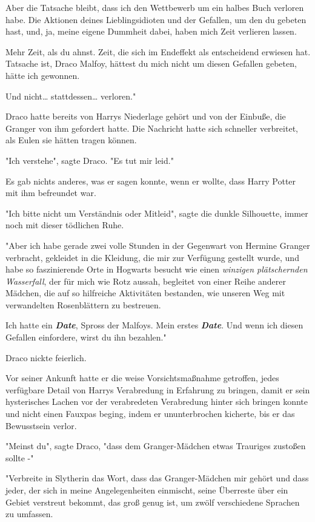 {Aber die Tatsache bleibt, dass ich den Wettbewerb um ein halbes Buch verloren habe. Die Aktionen deines Lieblingsidioten und der Gefallen, um den du gebeten hast, und, ja, meine eigene Dummheit dabei, haben mich Zeit verlieren lassen.

Mehr Zeit, als du ahnst. Zeit, die sich im Endeffekt als entscheidend erwiesen hat. Tatsache ist, Draco Malfoy, hättest du mich nicht um diesen Gefallen gebeten, hätte ich gewonnen.

Und nicht… stattdessen… verloren."

Draco hatte bereits von Harrys Niederlage gehört und von der Einbuße, die Granger von ihm gefordert hatte. Die Nachricht hatte sich schneller verbreitet, als Eulen sie hätten tragen können.

"Ich verstehe", sagte Draco. "Es tut mir leid."

Es gab nichts anderes, was er sagen konnte, wenn er wollte, dass Harry Potter mit ihm befreundet war.

"Ich bitte nicht um Verständnis oder Mitleid", sagte die dunkle Silhouette, immer noch mit dieser tödlichen Ruhe.

"Aber ich habe gerade zwei volle Stunden in der Gegenwart von Hermine Granger verbracht, gekleidet in die Kleidung, die mir zur Verfügung gestellt wurde, und habe so faszinierende Orte in Hogwarts besucht wie einen \emph{winzigen plätschernden Wasserfall}, der für mich wie Rotz aussah, begleitet von einer Reihe anderer Mädchen, die auf so hilfreiche Aktivitäten bestanden, wie unseren Weg mit verwandelten Rosenblättern zu bestreuen.

Ich hatte ein \textbf{\emph{Date}}, Spross der Malfoys. Mein erstes \textbf{\emph{Date}}. Und wenn ich diesen Gefallen einfordere, wirst du ihn bezahlen."

Draco nickte feierlich.

Vor seiner Ankunft hatte er die weise Vorsichtsmaßnahme getroffen, jedes verfügbare Detail von Harrys Verabredung in Erfahrung zu bringen, damit er sein hysterisches Lachen vor der verabredeten Verabredung hinter sich bringen konnte und nicht einen Fauxpas beging, indem er ununterbrochen kicherte, bis er das Bewusstsein verlor.

"Meinst du", sagte Draco, "dass dem Granger-Mädchen etwas Trauriges zustoßen sollte -"

"Verbreite in Slytherin das Wort, dass das Granger-Mädchen mir gehört und dass jeder, der sich in meine Angelegenheiten einmischt, seine Überreste über ein Gebiet verstreut bekommt, das groß genug ist, um zwölf verschiedene Sprachen zu umfassen.

}
